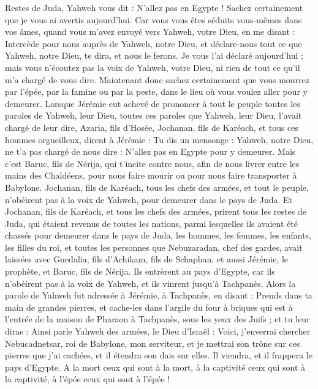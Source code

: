 \begin{multicols}{2}
Restes de Juda, Yahweh vous dit : N'allez pas en Egypte ! Sachez certainement que je vous ai avertis aujourd'hui.
Car vous vous êtes séduits vous-mêmes dans vos âmes, quand vous m'avez envoyé vers Yahweh, votre Dieu, en me disant : Intercède pour nous auprès de Yahweh, notre Dieu, et déclare-nous tout ce que Yahweh, notre Dieu, te dira, et nous le ferons.
Je vous l'ai déclaré aujourd'hui ; mais vous n’écoutez pas la voix de Yahweh, votre Dieu, ni rien de tout ce qu’il m’a chargé de vous dire.
Maintenant donc sachez certainement que vous mourrez par l'épée, par la famine ou par la peste, dans le lieu où vous voulez aller pour y demeurer.
\VerseOne{}Lorsque Jérémie eut achevé de prononcer à tout le peuple toutes les paroles de Yahweh, leur Dieu, toutes ces paroles que Yahweh, leur Dieu, l'avait chargé de leur dire,
Azaria, fils d’Hosée, Jochanan, fils de Karéach, et tous ces hommes orgueilleux, dirent à Jérémie : Tu dis un mensonge : Yahweh, notre Dieu, ne t'a pas chargé de nous dire : N'allez pas en Egypte pour y demeurer.
Mais c’est Baruc, fils de Nérija, qui t'incite contre nous, afin de nous livrer entre les mains des Chaldéens, pour nous faire mourir ou pour nous faire transporter à Babylone.
Jochanan, fils de Karéach, tous les chefs des armées, et tout le peuple, n'obéirent pas à la voix de Yahweh, pour demeurer dans le pays de Juda.
Et Jochanan, fils de Karéach, et tous les chefs des armées, prirent tous les restes de Juda, qui étaient revenus de toutes les nations, parmi lesquelles ils avaient été chassés pour demeurer dans le pays de Juda,
les hommes, les femmes, les enfants, les filles du roi, et toutes les personnes que Nebuzaradan, chef des gardes, avait laissées avec Guedalia, fils d'Achikam, fils de Schaphan, et aussi Jérémie, le prophète, et Baruc, fils de Nérija.
Ils entrèrent au pays d'Egypte, car ils n'obéirent pas à la voix de Yahweh, et ils vinrent jusqu'à Tachpanès.
Alors la parole de Yahweh fut adressée à Jérémie, à Tachpanès, en disant :
Prends dans ta main de grandes pierres, et cache-les dans l'argile du four à briques qui est à l'entrée de la maison de Pharaon à Tachpanès, sous les yeux des Juifs ;
et tu leur diras : Ainsi parle Yahweh des armées, le Dieu d'Israël : Voici, j’enverrai chercher Nebucadnetsar, roi de Babylone, mon serviteur, et je mettrai son trône sur ces pierres que j'ai cachées, et il étendra son dais sur elles.
Il viendra, et il frappera le pays d'Egypte. A la mort ceux qui sont à la mort, à la captivité ceux qui sont à la captivité, à l’épée ceux qui sont à l’épée !

\end{multicols}
